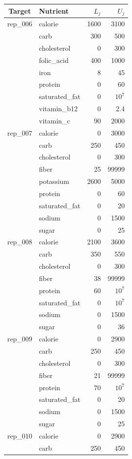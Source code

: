\begin{tabular}{@{}clrr@{}}
\toprule
Target & Nutrient & $L_j$ & $U_j$ \\
\midrule
rep\_006 & calorie & 1600 & 3100 \\
 & carb & 300 & 500 \\
 & cholesterol & 0 & 300 \\
 & folic\_acid & 400 & 1000 \\
 & iron & 8 & 45 \\
 & protein & 0 & 60 \\
 & saturated\_fat & 0 & $10^{7}$ \\
 & vitamin\_b12 & 0 & 2.4 \\
 & vitamin\_c & 90 & 2000 \\
\midrule
rep\_007 & calorie & 0 & 3000 \\
 & carb & 250 & 450 \\
 & cholesterol & 0 & 300 \\
 & fiber & 25 & 99999 \\
 & potassium & 2600 & 5000 \\
 & protein & 0 & 60 \\
 & saturated\_fat & 0 & 20 \\
 & sodium & 0 & 1500 \\
 & sugar & 0 & 25 \\
\midrule
rep\_008 & calorie & 2100 & 3600 \\
 & carb & 350 & 550 \\
 & cholesterol & 0 & 300 \\
 & fiber & 38 & 99999 \\
 & protein & 60 & $10^{7}$ \\
 & saturated\_fat & 0 & $10^{7}$ \\
 & sodium & 0 & 1500 \\
 & sugar & 0 & 36 \\
\midrule
rep\_009 & calorie & 0 & 2900 \\
 & carb & 250 & 450 \\
 & cholesterol & 0 & 300 \\
 & fiber & 21 & 99999 \\
 & protein & 70 & $10^{7}$ \\
 & saturated\_fat & 0 & 20 \\
 & sodium & 0 & 1500 \\
 & sugar & 0 & 25 \\
\midrule
rep\_010 & calorie & 0 & 2900 \\
 & carb & 250 & 450 \\

\end{tabular}

